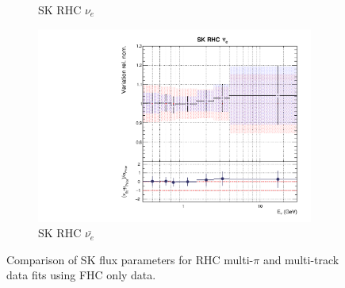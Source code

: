 \begin{figure}[t]
\begin{subfigure}{0.42\textwidth}
  \caption{SK RHC $\nu_{e}$}
\end{subfigure}
\begin{subfigure}{0.42\textwidth}
  \centering
  \includegraphics[width=0.75\linewidth]{figs/rhcmpdat248flux_15}
  \caption{SK RHC $\bar{\nu_e}$}
\end{subfigure}
\caption{Comparison of SK flux parameters for RHC multi-$\pi$ and multi-track data fits using FHC only data.}
\label{fig:rhcmpidat248fluxSK}
\end{figure}

